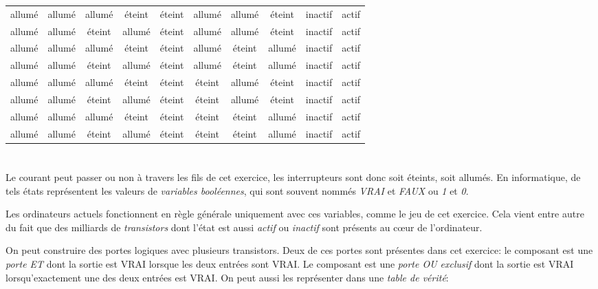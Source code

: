 {{{\begin{tabular}{ @{} c c c c c c c c c c @{} }
  allumé & allumé & allumé & éteint & éteint & allumé & allumé & éteint & inactif & actif \\ 
  allumé & allumé & éteint & allumé & éteint & allumé & allumé & éteint & inactif & actif \\ 
  allumé & allumé & allumé & éteint & éteint & allumé & éteint & allumé & inactif & actif \\ 
  allumé & allumé & éteint & allumé & éteint & allumé & éteint & allumé & inactif & actif \\ 
  allumé & allumé & allumé & éteint & éteint & éteint & allumé & éteint & inactif & actif \\ 
  allumé & allumé & éteint & allumé & éteint & éteint & allumé & éteint & inactif & actif \\ 
  allumé & allumé & allumé & éteint & éteint & éteint & éteint & allumé & inactif & actif \\ 
  allumé & allumé & éteint & allumé & éteint & éteint & éteint & allumé & inactif & actif
\end{tabular}


}



\section*{\BrochureItsInformatics}
Le courant peut passer ou non à travers les fils de cet exercice, les interrupteurs sont donc soit éteints, soit allumés. En informatique, de tels états représentent les valeurs de \emph{variables booléennes}, qui sont souvent nommés \emph{VRAI} et \emph{FAUX} ou \emph{1} et \emph{0}.

Les ordinateurs actuels fonctionnent en règle générale uniquement avec ces variables, comme le jeu de cet exercice. Cela vient entre autre du fait que des milliards de \emph{transistors} dont l’état est aussi \emph{actif} ou \emph{inactif} sont présents au cœur de l’ordinateur.

On peut construire des portes logiques avec plusieurs transistors. Deux de ces portes sont présentes dans cet exercice: le composant \raisebox{\dimexpr -0.5ex -0.6ex \relax}{} est une \emph{porte ET} dont la sortie est VRAI lorsque les deux entrées sont VRAI.   Le composant \raisebox{\dimexpr -0.5ex -0.6ex \relax}{} est une \emph{porte OU exclusif} dont la sortie est VRAI lorsqu’exactement une des deux entrées est VRAI. On peut aussi les représenter dans une \emph{table de vérité}:

}}
